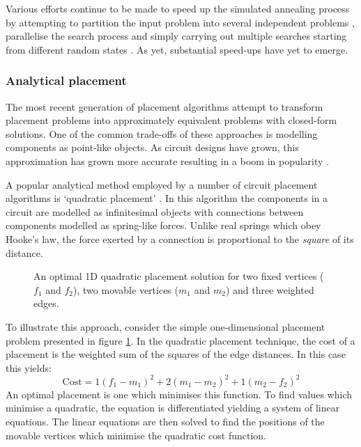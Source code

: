 				Various efforts continue to be made to speed up the simulated annealing
				process by attempting to partition the input problem into several
				independent problems \cite{choong10}, parallelise the search process
				\cite{ludwin08} and simply carrying out multiple searches starting from
				different random states \cite{haldar00}. As yet, substantial speed-ups
				have yet to emerge.
			
			\subsubsection{Analytical placement}
				
				The most recent generation of placement algorithms attempt to transform
				placement problems into approximately equivalent problems with
				closed-form solutions. One of the common trade-offs of these approaches
				is modelling components as point-like objects. As circuit designs have
				grown, this approximation has grown more accurate resulting in a boom
				in popularity \cite{markov15}.
				
				A popular analytical method employed by a number of circuit placement
				algorithms is `quadratic placement' \cite{kahng11,spindler08}. In this
				algorithm the components in a circuit are modelled as infinitesimal
				objects with connections between components modelled as spring-like
				forces. Unlike real springs which obey Hooke's law, the force exerted
				by a connection is proportional to the \emph{square} of its distance.
				
				\begin{figure}
					\center
					
					\caption{An optimal 1D quadratic placement solution for two fixed
					vertices ($f_1$ and $f_2$), two movable vertices ($m_1$ and $m_2$)
					and three weighted edges.}
					\label{fig:quadratic-placement}
				\end{figure}
				
				To illustrate this approach, consider the simple one-dimensional
				placement problem presented in figure \ref{fig:quadratic-placement}.
				In the quadratic placement technique, the cost of a placement is the
				weighted sum of the squares of the edge distances. In this case this
				yields:
				\begin{equation*}
					\textrm{Cost} = 1(f_1 - m_1)^2 + 2(m_1 - m_2)^2 + 1(m_2 - f_2)^2
				\end{equation*}
				An optimal placement is one which minimises this function. To find
				values which minimise a quadratic, the equation is differentiated
				yielding a system of linear equations. The linear equations are then
				solved to find the positions of the movable vertices which minimise the
				quadratic cost function.
				
